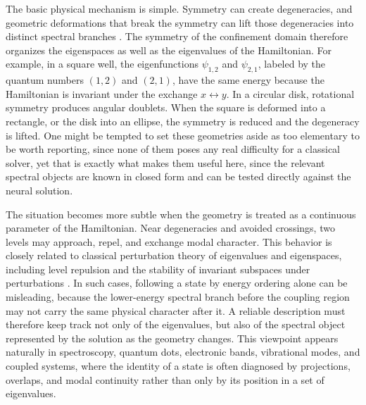 \documentclass[10pt,onecolumn]{article}
\begin{document}
The basic physical mechanism is simple. Symmetry can create degeneracies, and geometric deformations that break the symmetry can lift those degeneracies into distinct spectral branches \cite{Tinkham1964,Sakurai2020,Kato1995,Courant1953,AraujoLima2023,Dietz2008,Ree1998}. The symmetry of the confinement domain therefore organizes the eigenspaces as well as the eigenvalues of the Hamiltonian. For example, in a square well, the eigenfunctions $\psi_{1,2}$ and $\psi_{2,1}$, labeled by the quantum numbers $(1,2)$ and $(2,1)$, have the same energy because the Hamiltonian is invariant under the exchange $x\leftrightarrow y$. In a circular disk, rotational symmetry produces angular doublets. When the square is deformed into a rectangle, or the disk into an ellipse, the symmetry is reduced and the degeneracy is lifted. One might be tempted to set these geometries aside as too elementary to be worth reporting, since none of them poses any real difficulty for a classical solver, yet that is exactly what makes them useful here, since the relevant spectral objects are known in closed form and can be tested directly against the neural solution.

The situation becomes more subtle when the geometry is treated as a continuous parameter of the Hamiltonian. Near degeneracies and avoided crossings, two levels may approach, repel, and exchange modal character. This behavior is closely related to classical perturbation theory of eigenvalues and eigenspaces, including level repulsion and the stability of invariant subspaces under perturbations \cite{VonNeumannWigner1929,DavisKahan1970,StewartSun1990}. In such cases, following a state by energy ordering alone can be misleading, because the lower-energy spectral branch before the coupling region may not carry the same physical character after it. A reliable description must therefore keep track not only of the eigenvalues, but also of the spectral object represented by the solution as the geometry changes. This viewpoint appears naturally in spectroscopy, quantum dots, electronic bands, vibrational modes, and coupled systems, where the identity of a state is often diagnosed by projections, overlaps, and modal continuity rather than only by its position in a set of eigenvalues.
\end{document}
